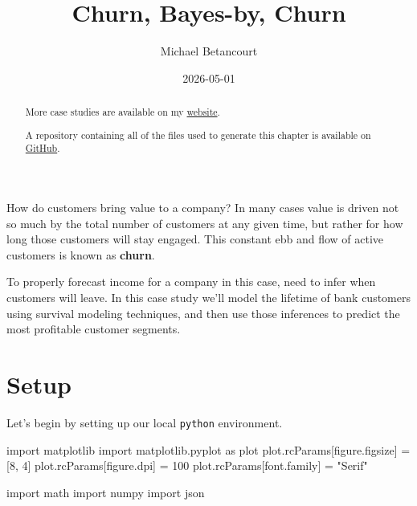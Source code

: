 \documentclass[
  letterpaper,
  DIV=11,
  numbers=noendperiod]{scrartcl}
\title{Churn, Bayes-by, Churn}
\author{Michael Betancourt}
\date{2026-05-01}
\newenvironment{Shaded}{\begin{snugshade}}{\end{snugshade}}
\newcommand{\DecValTok}[1]{\textcolor[rgb]{0.68,0.00,0.00}{#1}}
\newcommand{\ImportTok}[1]{\textcolor[rgb]{0.00,0.46,0.62}{#1}}
\newcommand{\NormalTok}[1]{\textcolor[rgb]{0.00,0.23,0.31}{#1}}
\newcommand{\OperatorTok}[1]{\textcolor[rgb]{0.37,0.37,0.37}{#1}}
\newcommand{\StringTok}[1]{\textcolor[rgb]{0.13,0.47,0.30}{#1}}
\renewcommand*\contentsname{Table of contents}
\newcommand\contentsname{Table of contents}
\begin{document}
\maketitle
\begin{abstract}
More case studies are available on my
\href{http://www.symplectomorphic.com/writing/\#case-studies}{website}.

A repository containing all of the files used to generate this chapter
is available on
\href{https://github.com/betanalpha/quarto_case_studies/tree/main/churn}{GitHub}.
\end{abstract}

\renewcommand*\contentsname{Table of contents}
{
\hypersetup{linkcolor=}
\setcounter{tocdepth}{3}
\tableofcontents
}
How do customers bring value to a company? In many cases value is driven
not so much by the total number of customers at any given time, but
rather for how long those customers will stay engaged. This constant ebb
and flow of active customers is known as \textbf{churn}.

To properly forecast income for a company in this case, need to infer
when customers will leave. In this case study we'll model the lifetime
of bank customers using survival modeling techniques, and then use those
inferences to predict the most profitable customer segments.

\section{Setup}\label{setup}

Let's begin by setting up our local \texttt{python} environment.

\begin{Shaded}
\begin{Highlighting}[]
\ImportTok{import}\NormalTok{ matplotlib}
\ImportTok{import}\NormalTok{ matplotlib.pyplot }\ImportTok{as}\NormalTok{ plot}
\NormalTok{plot.rcParams[}\StringTok{\textquotesingle{}figure.figsize\textquotesingle{}}\NormalTok{] }\OperatorTok{=}\NormalTok{ [}\DecValTok{8}\NormalTok{, }\DecValTok{4}\NormalTok{]}
\NormalTok{plot.rcParams[}\StringTok{\textquotesingle{}figure.dpi\textquotesingle{}}\NormalTok{] }\OperatorTok{=} \DecValTok{100}
\NormalTok{plot.rcParams[}\StringTok{\textquotesingle{}font.family\textquotesingle{}}\NormalTok{] }\OperatorTok{=} \StringTok{"Serif"}

\ImportTok{import}\NormalTok{ math}
\ImportTok{import}\NormalTok{ numpy}
\ImportTok{import}\NormalTok{ json}
\end{Highlighting}
\end{Shaded}
\end{document}
